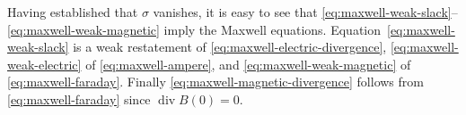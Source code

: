 {Having established that $\sigma$ vanishes, it is easy to see that \eqref{eq:maxwell-weak-slack}--\eqref{eq:maxwell-weak-magnetic} imply the Maxwell equations. Equation~\eqref{eq:maxwell-weak-slack} is a weak restatement of \eqref{eq:maxwell-electric-divergence}, \eqref{eq:maxwell-weak-electric} of \eqref{eq:maxwell-ampere}, and \eqref{eq:maxwell-weak-magnetic} of \eqref{eq:maxwell-faraday}. Finally \eqref{eq:maxwell-magnetic-divergence} follows from \eqref{eq:maxwell-faraday} since $\operatorname{div}B(0)=0$.}
